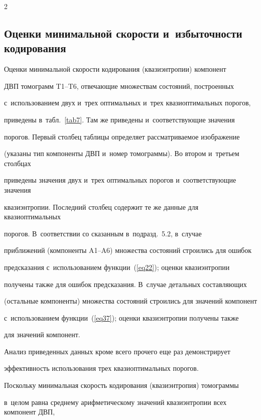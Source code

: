 \begin{multicols}{2}
\begin{table}[b]
\end{table}



\subsection{Оценки минимальной скорости и~избыточности кодирования}





Оценки минимальной скорости кодирования (квазиэнтропии) компонент 

ДВП томограмм T1--T6, отвечающие множествам состояний, построенных 

с~использованием двух и~трех оптимальных и~трех квазиоптимальных порогов, 

приведены в~табл.~\ref{tab7}. Там же приведены и~соответствующие значения 

порогов. Первый столбец таблицы определяет рассматриваемое изображение 

(указаны тип компоненты ДВП и~номер томограммы). Во втором и~третьем столбцах 

приведены значения двух и~трех оптимальных порогов и~соответствующие значения 

квазиэнтропии. Последний столбец содержит те же данные для квазиоптимальных 

порогов. В~соответствии со сказанным в~подразд.~5.2, в~случае 

приближений (компоненты A1--A6) множества состояний строились для ошибок 

предсказания с~использованием функции~(\ref{eq22}); оценки квазиэнтропии 

получены также для ошибок предсказания. В~случае детальных составляющих 

(остальные компоненты) множества состояний строились для значений компонент 

с~использованием функции~(\ref{eq37}); оценки квазиэнтропии получены также 

для значений компонент.



Анализ приведенных данных кроме всего прочего еще раз демонстрирует 

эффективность использования трех квазиоптимальных порогов.

%

Поскольку минимальная скорость кодирования (квазиэнтропия) томограммы 

в~целом равна среднему арифметическому значений квазиэнтропии всех компонент ДВП, 


\end{multicols}
